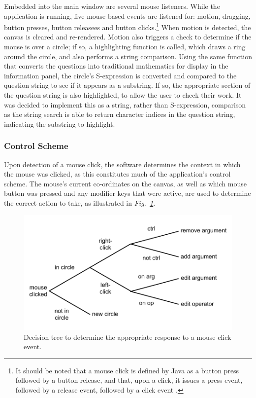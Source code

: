 \documentclass[12pt,twoside,notitlepage,xetex]{report}
\begin{document}
{Embedded into the main window are several mouse listeners.  While the application is running, five mouse-based events are listened for: motion, dragging, button presses, button releasees and button clicks.\footnote{It should be noted that a mouse click is defined by Java as a button press followed by a button release, and that, upon a click, it issues a press event, followed by a release event, followed by a click event \cite{JavaApi}.}  When motion is detected, the canvas is cleared and re-rendered.  Motion also triggers a check to determine if the mouse is over a circle; if so, a highlighting function is called, which draws a ring around the circle, and also performs a string comparison.  Using the same function that converts the questions into traditional mathematics for display in the information panel, the circle's S-expression is converted and compared to the question string to see if it appears as a substring.  If so, the appropriate section of the question string is also highlighted, to allow the user to check their work.  It was decided to implement this as a string, rather than S-expression, comparison as the string search is able to return character indices in the question string, indicating the substring to highlight.

\subsubsection{Control Scheme}

Upon detection of a mouse click, the software determines the context in which the mouse was clicked, as this constitutes much of the application's control scheme.  The mouse's current co-ordinates on the canvas, as well as which mouse button was pressed and any modifier keys that were active, are used to determine the correct action to take, as illustrated in \emph{Fig.~\ref{fig:ClickTree}}.

\begin{center}
\begin{figure}[H]
\begin{center}
\includegraphics[width=\textwidth-4cm]{figs/nico_click.pdf}
\end{center}
\caption{Decision tree to determine the appropriate response to a mouse click event.}
\label{fig:ClickTree}
\end{figure}
\end{center}

}
\end{document}
